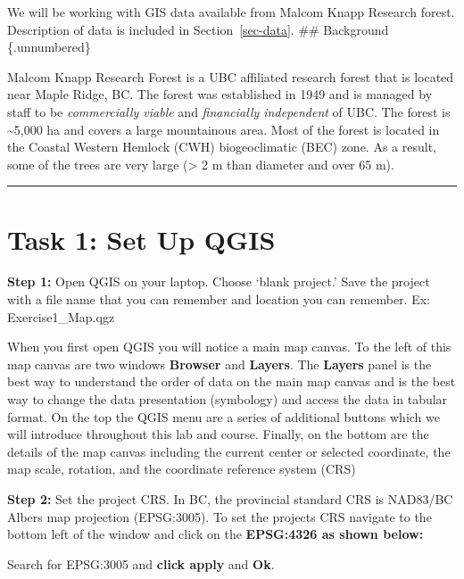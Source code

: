 \documentclass[
  letterpaper,
]{book}
\begin{document}

We will be working with GIS data available from Malcom Knapp Research
forest. Description of data is included in Section~\ref{sec-data}. \#\#
Background \{.unnumbered\}

Malcom Knapp Research Forest is a UBC affiliated research forest that is
located near Maple Ridge, BC. The forest was established in 1949 and is
managed by staff to be \emph{commercially viable} and \emph{financially
independent} of UBC. The forest is \textasciitilde5,000 ha and covers a
large mountainous area. Most of the forest is located in the Coastal
Western Hemlock (CWH) biogeoclimatic (BEC) zone. As a result, some of
the trees are very large (\textgreater{} 2 m than diameter and over 65
m).

\begin{center}\rule{0.5\linewidth}{0.5pt}\end{center}

\hypertarget{task-1-set-up-qgis}{%
\section*{Task 1: Set Up QGIS}\label{task-1-set-up-qgis}}


\textbf{Step 1:} Open QGIS on your laptop. Choose `blank project.' Save
the project with a file name that you can remember and location you can
remember. Ex: Exercise1\_Map.qgz

When you first open QGIS you will notice a main map canvas. To the left
of this map canvas are two windows \textbf{Browser} and \textbf{Layers}.
The \textbf{Layers} panel is the best way to understand the order of
data on the main map canvas and is the best way to change the data
presentation (symbology) and access the data in tabular format. On the
top the QGIS menu are a series of additional buttons which we will
introduce throughout this lab and course. Finally, on the bottom are the
details of the map canvas including the current center or selected
coordinate, the map scale, rotation, and the coordinate reference system
(CRS)

\textbf{Step 2:} Set the project CRS. In BC, the provincial standard CRS
is NAD83/BC Albers map projection (EPSG:3005). To set the projects CRS
navigate to the bottom left of the window and click on the
\textbf{EPSG:4326 as shown below:}

Search for EPSG:3005 and \textbf{click apply} and \textbf{Ok}.
\end{document}

